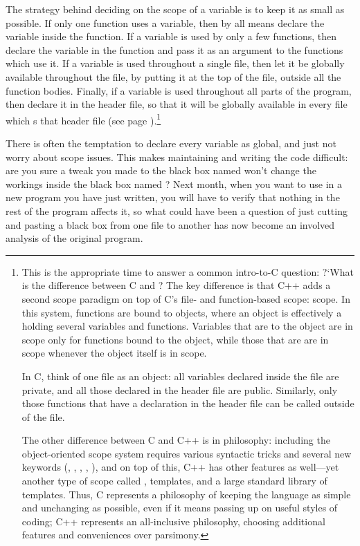 The strategy behind deciding on the scope of a variable is
to keep it as small as possible. If only one function uses a variable,
then by all means declare the variable inside the function.
If a variable is used by only a few functions,
then declare the variable in the  function and pass it as an
argument to the functions which use it. If a variable is used throughout
a single file, then let it be globally available throughout the file, by
putting it at the top of the file, outside all the function bodies. Finally,
if a variable is used throughout all parts of the program, then declare it in
the header file, so that it will be globally available in every
file which s that header file (see page 
\pageref{fileglobal}).\footnote{This is the appropriate time to answer a
common intro-to-C question: ?`What is the difference between C and
? The key difference is that C++ adds a second scope paradigm
on top of C's file- and function-based scope: 
scope. In this system, functions are bound to objects, where an object is
effectively a  holding several variables and functions. Variables
that are  to the object are in scope only for functions
bound to the object, while those that are  are in scope
whenever the object itself is in scope.

In C, think
of one file as an object: all variables declared inside the file are
private, and all those declared in the header file are public. Similarly,
only those functions that have a declaration in the header file can be
called outside of the file.

The other difference between C and C++ is in philosophy: including the
object-oriented scope system requires various syntactic tricks and several
new keywords (, , , ,
), and on top of this, C++ has other features as well---yet
another type of scope called , templates, and a
large standard library of templates. Thus, C represents a philosophy
of keeping the language as simple and unchanging as possible, even
if it means passing up on useful styles of coding; C++ represents an
all-inclusive philosophy, choosing additional features and conveniences
over parsimony.  }

There is often the temptation to declare every variable as global, and
just not worry about scope issues. This makes maintaining and writing
the code difficult: are you sure a tweak you made to the black box named
 won't change the workings inside the black box named
? Next month, when you want to use 
in a new program you have just written, you will have to verify that nothing
in the rest of the program affects it, so what could have been a question
of just cutting and pasting a black box from one file to another has
now become an involved analysis of the original program.  

